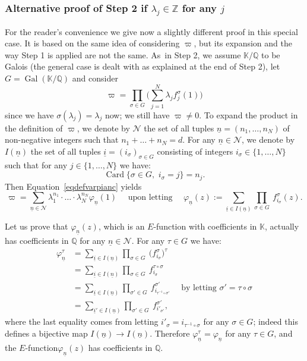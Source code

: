 \documentclass[JEP,XML,SOM,Unicode,published]{cedram}
\newcommand{\Efunction}{$E$\nobreakdash-func\-tion\xspace}
\theoremstyle{definition}
\newcommand{\Z}{\mathbb{Z}}
\newcommand{\Q}{\mathbb{Q}}
\newcommand{\K}{\mathbb{K}}
\DeclareMathOperator{\Gal}{Gal}
\newcommand{\calN}{\mathcal N}
\DeclareMathOperator{\Card}{Card}
\newcommand{\isoul}{{\underline{i}}}
\newcommand{\nsoul}{\underline{n}}
\begin{document}
\subsubsection*{Alternative proof of Step 2 if $\lambda_j\in\Z$ for any $j$}
For the reader's convenience we give now a slightly different proof in this special case. It is based on the same idea of considering $\varpi$, but its expansion and the way Step 1 is applied are not the same. As~in Step 2, we assume $\K/\Q$ to be Galois (the general case is dealt with as explained at the end of Step 2), let $G=\Gal(\K/\Q)$ and consider
\begin{equation} \label{eqdefvarpianc}
\varpi = \prod_{\sigma\in G} \Big( \sum_{j=1}^N \lambda_j f_j^\sigma(1)\Big)
\end{equation}
since we have $\sigma(\lambda_j)=\lambda_j$ now; we still have $\varpi\neq 0$. To expand the product in the definition of $\varpi$, we denote by $\calN$ the set of all tuples $\nsoul = (n_1,\ldots,n_N)$ of non-negative integers such that $ n_1 + \ldots + n_N = d$. For any $\nsoul\in\calN$, we denote by $I(\nsoul) $ the set of all tuples $\isoul = (i_\sigma)_{\sigma\in G}$ consisting of	 integers $i_\sigma\in\{1,\ldots,N\}$ such that for any $j\in\{1,\ldots,N\}$ we have:
\[
\Card \{ \sigma\in G, \, \, i_\sigma=j\}=n_j.
\]
Then Equation~\eqref{eqdefvarpianc} yields
\begin{equation} \label{eqvarpi2}
\varpi = \sum_{\nsoul \in \calN} \lambda_1^{n_1} \cdot \ldots \cdot \lambda_N^{n_N} \varphi_{\nsoul}(1) \quad \mbox{ upon letting }\quad
\varphi_{\nsoul}(z) := \sum_{ \isoul\in I(\nsoul)} \prod_{\sigma\in G} \ f_{i_\sigma}^\sigma(z) .
\end{equation}

Let us prove that $\varphi_{\nsoul}(z)$, which is an \Efunction with coefficients in $\K$, actually has coefficients in $\Q$ for any $\nsoul\in\calN$. For any $\tau\in G$ we have:
\begin{align*}
\varphi_{\nsoul} ^\tau
&= \sum_{ \isoul\in I(\nsoul)} \prod_{\sigma\in G} \ \Big( f_{i_\sigma}^\sigma \Big)^\tau \\
&= \sum_{ \isoul\in I(\nsoul)} \prod_{\sigma\in G} \ f_{i_\sigma}^{\tau\circ\sigma} \\
&= \sum_{ \isoul\in I(\nsoul)} \prod_{\sigma'\in G} \ f_{i_{\tau^{-1}\circ\sigma'}}^{ \sigma'} \quad \mbox{ by letting } \sigma'=\tau\circ\sigma\\
&= \sum_{ \isoul' \in I(\nsoul)} \prod_{\sigma'\in G} \ f_{i'_{ \sigma'}}^{ \sigma'},
\end{align*}
where the last equality comes from letting $ i'_\sigma = i_{\tau^{-1}\circ\sigma}$ for any $\sigma\in G$; indeed this defines a bijective map $I(\nsoul)\to I(\nsoul)$. Therefore $\varphi_{\nsoul} ^\tau = \varphi_{\nsoul}$ for any $\tau\in G$, and the \Efunction $\varphi_{\nsoul}(z)$ has coefficients in $\Q$.
\end{document}
